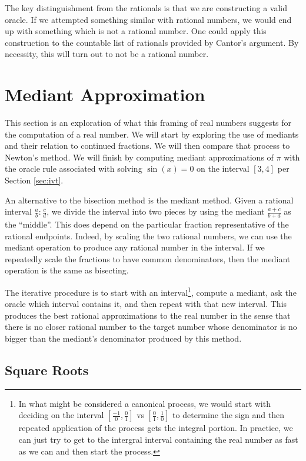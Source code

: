 \documentclass[12pt]{article}
\theoremstyle{remark}
\begin{document}
The key distinguishment from the rationals is that we are constructing a valid oracle. If we attempted something similar with rational numbers, we would end up with something which is not a rational number. One could apply this construction to the countable list of rationals provided by Cantor's argument. By necessity, this will turn out to not be a rational number. 

\section{Mediant Approximation}\label{sec:mediant}

This section is an exploration of what this framing of real numbers suggests for the computation of a real number. We will start by exploring the use of mediants and their relation to continued fractions. We will then compare that process to Newton's method. We will finish by computing mediant approximations of $\pi$ with the oracle  rule associated with solving $\sin(x)=0$ on the interval $[3,4]$ per Section \ref{sec:ivt}.

An alternative to the bisection method is the mediant method. Given a rational interval $\frac{a}{b} : \frac{c}{d}$, we divide the interval into two pieces by using the mediant $\frac{a+c}{b+d}$ as the ``middle''. This does depend on the particular fraction representative of the rational endpoints. Indeed, by scaling the two rational numbers, we can use the mediant operation to produce any rational number in the interval. If we repeatedly scale the fractions to have common denominators, then the mediant operation is the same as bisecting. 

The iterative procedure is to start with an interval\footnote{In what might be considered a canonical process, we would start with deciding on the interval $[\frac{-1}{0}, \frac{0}{1}]$ vs $[\frac{0}{1}, \frac{1}{0}]$ to determine the sign and then repeated application of the process gets the integral portion. In practice, we can just try to get to the intergral interval containing the real number as fast as we can and then start the process.}, compute a mediant, ask the oracle which interval contains it, and then repeat with that new interval. This produces the best rational approximations to the real number in the sense that there is no closer rational number to the target number whose denominator is no bigger than the mediant's denominator produced by this method. 


\subsection{Square Roots}
\end{document}
